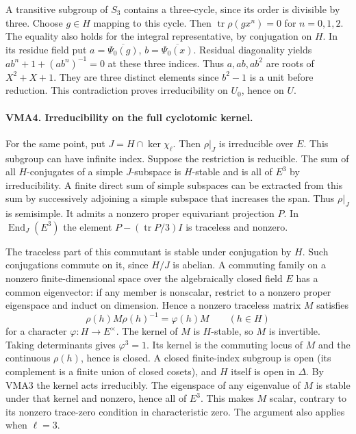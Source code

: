 A transitive subgroup of $S_3$ contains a three-cycle, since its
order is divisible by three. Choose $g\in H$ mapping to this
cycle. Then $\operatorname{tr}\rho(gx^n)=0$ for $n=0,1,2$.
The equality also holds for the integral representative, by
conjugation on $H$. In its residue field put
$a=\overline{\Psi_0(g)}$, $b=\overline{\Psi_0(x)}$. Residual
diagonality yields $ab^n+1+(ab^n)^{-1}=0$ at these three indices.
Thus $a,ab,ab^2$ are roots of $X^2+X+1$. They are three distinct
elements since $b^2-1$ is a unit before reduction. This contradiction
proves irreducibility on $U_0$, hence on $U$.

\paragraph{VMA4. Irreducibility on the full cyclotomic kernel.}
\label{claim:VMA4}
For the same point, put $J=H\cap\ker\chi_\ell$. Then
$\rho|_J$ is irreducible over $E$. This subgroup can have infinite
index. Suppose the restriction is reducible. The sum of all
$H$-conjugates of a simple $J$-subspace is $H$-stable and is
all of $E^3$ by irreducibility. A finite direct sum of simple
subspaces can be extracted from this sum by successively adjoining
a simple subspace that increases the span. Thus $\rho|_J$ is
semisimple. It admits a nonzero proper equivariant projection $P$.
In $\operatorname{End}_J(E^3)$ the element
$P-(\operatorname{tr}P/3)I$ is traceless and nonzero.

The traceless part of this commutant is stable under conjugation
by $H$. Such conjugations commute on it, since $H/J$ is abelian.
A commuting family on a nonzero finite-dimensional space over the
algebraically closed field $E$ has a common eigenvector: if any
member is nonscalar, restrict to a nonzero proper eigenspace and
induct on dimension. Hence a nonzero traceless matrix $M$ satisfies
\[
       \rho(h)M\rho(h)^{-1}=\varphi(h)M\qquad (h\in H)
\]
for a character $\varphi:H\to E^\times$. The kernel of $M$ is
$H$-stable, so $M$ is invertible. Taking determinants gives
$\varphi^3=1$. Its kernel is the commuting locus of $M$ and the
continuous $\rho(h)$, hence is closed. A closed finite-index
subgroup is open (its complement is a finite union of closed
cosets), and $H$ itself is open in $\Delta$. By VMA3 the kernel
acts irreducibly. The eigenspace of any eigenvalue of $M$ is stable
under that kernel and nonzero, hence all of $E^3$. This makes
$M$ scalar, contrary to its nonzero trace-zero condition in
characteristic zero. The argument also applies when $\ell=3$.

